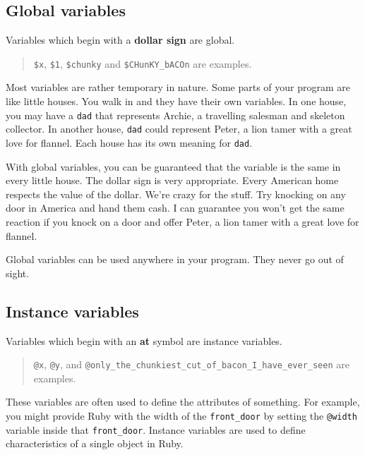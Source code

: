 \documentclass[10pt,twoside]{report}
\begin{document}
\subsection{Global variables}



Variables which begin with a {\bf dollar sign} are global.

\begin{quote}
\lstinline[breaklines=true]|$x|, \lstinline[breaklines=true]|$1|,
\lstinline[breaklines=true]|$chunky| and
\lstinline[breaklines=true]|$CHunKY_bACOn| are examples.\end{quote}


Most variables are rather temporary in nature.  Some parts of your
program are like little houses. You walk in and they have their own
variables.  In one house, you may have a
\lstinline[breaklines=true]|dad| that represents Archie, a travelling
salesman and skeleton collector.  In another house,
\lstinline[breaklines=true]|dad| could represent Peter, a lion tamer
with a great love for flannel.  Each house has its own meaning for
\lstinline[breaklines=true]|dad|.

With global variables, you can be guaranteed that the variable is the
same in every little house. The dollar sign is very appropriate.
Every American home respects the value of the dollar.  We're crazy for
the stuff.  Try knocking on any door in America and hand them cash.  I
can guarantee you won't get the same reaction if you knock on a door
and offer Peter, a lion tamer with a great love for flannel.

Global variables can be used anywhere in your program.  They never go
out of sight.




\subsection{Instance variables}



Variables which begin with an {\bf at} symbol are instance variables.

\begin{quote}
\lstinline[breaklines=true]|@x|, \lstinline[breaklines=true]|@y|, and
\lstinline[breaklines=true]|@only_the_chunkiest_cut_of_bacon_I_have_ever_seen|
are examples.\end{quote}


These variables are often used to define the attributes of something.
For example, you might provide Ruby with the width of the
\lstinline[breaklines=true]|front_door| by setting the
\lstinline[breaklines=true]|@width| variable inside that
\lstinline[breaklines=true]|front_door|.  Instance variables are used
to define characteristics of a single object in Ruby.
\end{document}
